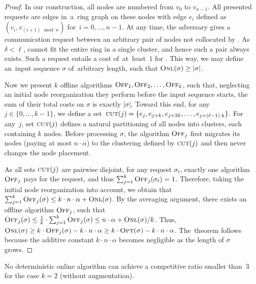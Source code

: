 \begin{proof}
In our construction, all nodes are numbered from $v_0$ to $v_{n-1}$. All
presented requests are edges in~a~ring graph on these nodes with edge $e_i$
defined as $(v_i,v_{(i+1) \mod n })$ for~$i = 0, \ldots, n-1$. At any time,
the adversary gives a communication request between an arbitrary pair of nodes
not collocated by \ONL. As $\delta < \ell$, \ONL cannot fit the entire ring in
a single cluster, and hence such a pair always exists. Such a request
entails a cost of~at~least~$1$ for \ONL. This way, we may define an~input
sequence $\sigma$ of~arbitrary length, such that $\textsc{Onl}(\sigma) \geq
|\sigma|$.

Now we present $k$ offline algorithms $\textsc{Off}_1, \textsc{Off}_2, \ldots, \textsc{Off}_k$, such
that, neglecting an initial node reorganization they perform before
the input sequence starts, the sum of their total costs on $\sigma$ is exactly
$|\sigma|$. Toward this end, for any $j \in \{0,\ldots,k-1\}$, we define a
set~$\textsc{cut}(j) = \{ e_j, e_{j+k}, e_{j+2k},
\ldots, e_{j+(\ell-1)\cdot k} \}$. For any~$j$, set $\textsc{cut}(j)$ defines a
natural partitioning of all nodes into clusters, each containing $k$ nodes.
Before processing $\sigma$, the algorithm $\textsc{Off}_j$ first migrates its nodes
(paying at most $n \cdot \alpha$) to the clustering defined by $\textsc{cut}(j)$ and
then never changes the node placement.

As all sets $\textsc{cut}(j)$ are pairwise disjoint, for any request $\sigma_t$,
exactly one algorithm $\textsc{Off}_j$ pays for the request, and thus $\sum_{j=1}^k
\textsc{Off}_j(\sigma_t) = 1$. Therefore, taking the initial node reorganization into
account, we obtain that $\sum_{j=1}^k \textsc{Off}_j(\sigma) \leq k \cdot n \cdot
\alpha + \textsc{Onl}(\sigma)$. By the averaging argument, there exists an offline
algorithm $\textsc{Off}_j$, such that $\textsc{Off}_j(\sigma) \leq \frac{1}{k} \cdot
\sum_{j=1}^k \textsc{Off}_j(\sigma) \leq n \cdot \alpha + \textsc{Onl}(\sigma) / k$.
Thus, $\textsc{Onl}(\sigma) \geq k \cdot \textsc{Off}_j(\sigma) - k \cdot n \cdot
\alpha \geq k \cdot \textsc{Opt}(\sigma) - k \cdot n \cdot \alpha$.
The~theorem follows because the additive constant $k \cdot n \cdot \alpha$
becomes negligible as the length of $\sigma$ grows.
\end{proof}


\begin{theorem}
No deterministic online algorithm \ONL can achieve a competitive ratio 
smaller than~$3$ for the case $k = 2$ (without augmentation).
\end{theorem}

